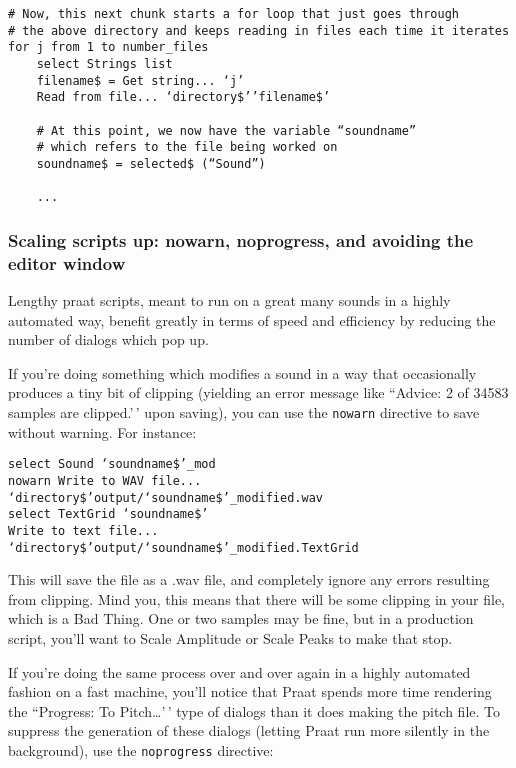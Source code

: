 \documentclass[11pt]{article}
\begin{document}
\begin{verbatim} 
# Now, this next chunk starts a for loop that just goes through 
# the above directory and keeps reading in files each time it iterates
for j from 1 to number_files
    select Strings list
    filename$ = Get string... ‘j’
    Read from file... ‘directory$’’filename$’
    
    # At this point, we now have the variable “soundname” 
    # which refers to the file being worked on
    soundname$ = selected$ (“Sound”)
    
    ...
\end{verbatim}

\hypertarget{scaling-scripts-up-nowarn-noprogress-and-avoiding-the-editor-window}{%
\subsubsection{Scaling scripts up: nowarn, noprogress, and avoiding the
editor
window}\label{scaling-scripts-up-nowarn-noprogress-and-avoiding-the-editor-window}}

\label{scaling}

Lengthy praat scripts, meant to run on a great many sounds in a highly
automated way, benefit greatly in terms of speed and efficiency by
reducing the number of dialogs which pop up.

If you're doing something which modifies a sound in a way that
occasionally produces a tiny bit of clipping (yielding an error message
like ``Advice: 2 of 34583 samples are clipped.'\,' upon saving), you can
use the \texttt{nowarn} directive to save without warning. For instance:

\begin{verbatim} 
select Sound ‘soundname$’_mod
nowarn Write to WAV file... ‘directory$’output/‘soundname$’_modified.wav
select TextGrid ‘soundname$’
Write to text file... ‘directory$’output/‘soundname$’_modified.TextGrid
\end{verbatim}

This will save the file as a .wav file, and completely ignore any errors
resulting from clipping. Mind you, this means that there will be some
clipping in your file, which is a Bad Thing. One or two samples may be
fine, but in a production script, you'll want to Scale Amplitude or
Scale Peaks to make that stop.

If you're doing the same process over and over again in a highly
automated fashion on a fast machine, you'll notice that Praat spends
more time rendering the ``Progress: To Pitch\ldots'\,' type of dialogs
than it does making the pitch file. To suppress the generation of these
dialogs (letting Praat run more silently in the background), use the
\texttt{noprogress} directive:
\end{document}
